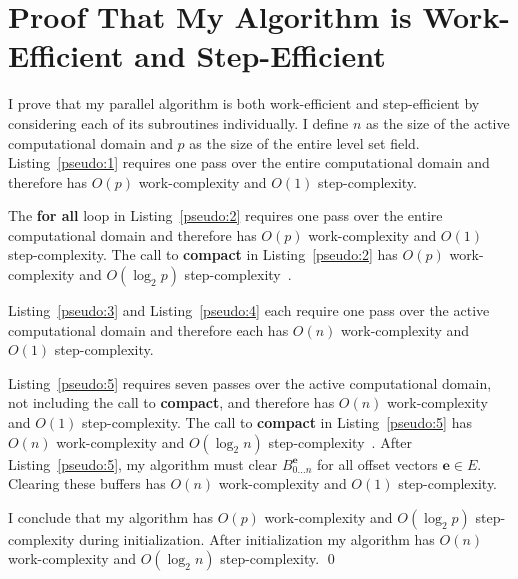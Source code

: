 \fancyhead[RO,LE]{\thepage}
\fancyfoot{} 
\chapter{Proof That My Algorithm is Work-Efficient and Step-Efficient}
\label{app:proof}

I prove that my parallel algorithm is both work-efficient and step-efficient by considering each of its subroutines individually. I define $n$ as the size of the active computational domain and $p$ as the size of the entire level set field.
Listing~\ref{pseudo:1} requires one pass over the entire computational domain and therefore has $O(p)$ work-complexity and $O(1)$ step-complexity.

The \textbf{for all} loop in Listing~\ref{pseudo:2} requires one pass over the entire computational domain and therefore has $O(p)$ work-complexity and $O(1)$ step-complexity. The call to \textbf{compact} in Listing~\ref{pseudo:2} has $O(p)$ work-complexity and $O({\log}_2 p)$ step-complexity~\cite{Harris-2007,Sengupta-2007,Sengupta-2011}.

Listing~\ref{pseudo:3} and Listing~\ref{pseudo:4} each require one pass over the active computational domain and therefore each has $O(n)$ work-complexity and $O(1)$ step-complexity.

Listing~\ref{pseudo:5} requires seven passes over the active computational domain, not including the call to \textbf{compact}, and therefore has $O(n)$ work-complexity and $O(1)$ step-complexity. The call to \textbf{compact} in Listing~\ref{pseudo:5} has $O(n)$ work-complexity and $O({\log}_2 n)$ step-complexity~\cite{Harris-2007,Sengupta-2007,Sengupta-2011}. After Listing~\ref{pseudo:5}, my algorithm must clear $B^{\mathbf{e}}_{0 \ldots n}$ for all offset vectors $\mathbf{e} \in E$. Clearing these buffers has $O(n)$ work-complexity and $O(1)$ step-complexity.

I conclude that my algorithm has $O(p)$ work-complexity and $O({\log}_2 p)$ step-complexity during initialization. After initialization my algorithm has $O(n)$ work-complexity and $O({\log}_2 n)$ step-complexity. \qed

